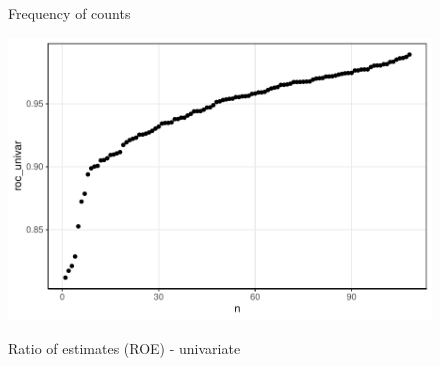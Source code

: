 \documentclass[12pt]{article}
\begin{document}
\begin{figure}[!h]
    \centering
    \caption{Frequency of counts}
    \label{graph_ctgan_frequency}
\end{figure}

\begin{figure}[!h]
    \centering
    \caption{Ratio of estimates (ROE) - univariate}
    \includegraphics{../graphs/ctgan/graph_ctgan_roc_univar_raw.pdf}
    \label{graph_ctgan_roc_univar_raw}
\end{figure}
\end{document}
